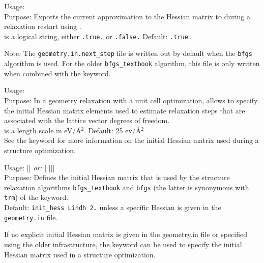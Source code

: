 {
  \noindent
  Usage:   \\
  Purpose: Exports the current approximation to
  the Hessian matrix to  during a 
  relaxation restart using . \\ 
   is a logical string, either \texttt{.true.} or
    \texttt{.false.} Default: \texttt{.true.} \\
}

Note: The \texttt{geometry.in.next\_step} file is written out by
default when the  \texttt{bfgs} algorithm
is used. For the older \texttt{bfgs\_textbook} algorithm, this file is
only written when combined with the 
keyword. 

{
  \noindent
  Usage:   \\[1.0ex]
  Purpose: In a geometry relaxation with a unit cell optimization,
    allows to specify the initial Hessian matrix elements used to
    estimate relaxation steps that are associated with the lattice
    vector degrees of freedom.
  \\[1.0ex]
   is a length scale in eV/{\AA$^2$}. Default: 25
  ev/{\AA$^2$} \\ 
}
See the  keyword for more information on the
initial Hessian matrix used during a structure optimization.

{
  \noindent
  Usage:   []
  \emph{or:}   [
  []]
  \\[1.0ex]
  Purpose: Defines the initial Hessian matrix that is used by the
  structure relaxation algorithms \texttt{bfgs\_textbook} and
  \texttt{bfgs} (the latter is synonymous with \texttt{trm}) of the
   keyword.
  \\[1.0ex]
  Default: \texttt{init\_hess Lindh 2.} unless a specific Hessian is
  given in the \texttt{geometry.in} file. \\ 
}

If no explicit initial Hessian matrix is given in the geometry.in file
or specified using the older 
infrastructure, the keyword  can be used to
specify the initial Hessian matrix used in a structure optimization. 

